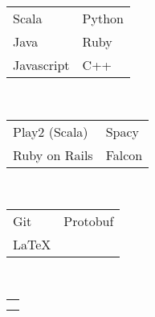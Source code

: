 {		\majorsection{\educationhistory} \quarterlinebreak \\
		\educationUW \quarterlinebreak \\
		\educationEvergreen \quarterlinebreak \\
		\educationHyogo
	}{ %
		
		\noindent\begin{minipage}[t]{0.275\textwidth}
			
			\sidesection{\skills} \\ 
			\textbf{\skillsprogramminglanguages} \\
			\begin{tabular}{l l}
				Scala &  Python  \\ 
				Java  & Ruby  \\ 
				Javascript & C++
			\end{tabular}
			
			\textbf{\skillsframeworks} \\
			\begin{tabular}{l l}
				Play2 (Scala) & Spacy  \\
				Ruby on Rails & Falcon 
			\end{tabular}
			
			\textbf{\skillsmisc} \\
			\begin{tabular}{l l}
				Git & Protobuf \\
				\LaTeX
			\end{tabular}
			
			\textbf{\skillslanguage} \\
			\begin{tabular}{l}
				\skillenglish \\
				\skilljapanese
			\end{tabular} \quarterlinebreak \\
			
			\sidesection{\educationhistory} \quarterlinebreak\\
			\educationUW 
			\sidebarcoursework
			\educationEvergreen
			\educationHyogo
			
		\end{minipage}
		\hfill
		\begin{minipage}[t]{0.7\textwidth}
			\majorsection{\experience} \\
			\jobexpEbay
			\jobexpGDIIntern
			\majorsection{\projectsawards} \halflinebreak \\
			\awardAmplify \quarterlinebreak\\
			\awardGoldenTicket \quarterlinebreak\\
			\awardParasite
		\end{minipage}
		
	}
	
